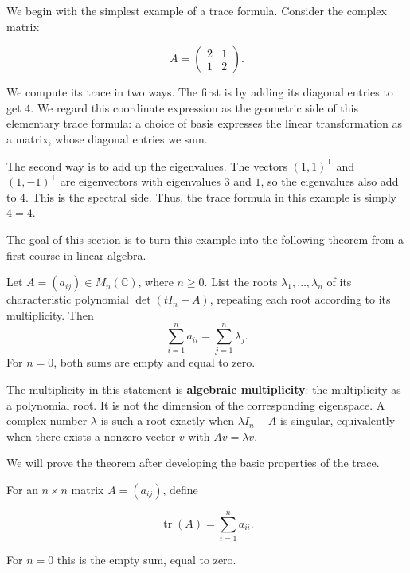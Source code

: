 \label{a-quantity-seen-in-two-ways}

We begin with the simplest example of a trace formula.  Consider the complex matrix

\[
A=\begin{pmatrix}2&1\\1&2\end{pmatrix}.
\]

We compute its trace in two ways. The first is by adding its diagonal entries to get $4$. We regard this coordinate expression as the geometric side of this elementary trace formula: a choice of basis expresses the linear transformation as a matrix, whose diagonal entries we sum.

\label{linear-algebra.transpose}

The second way is to add up the eigenvalues. The vectors $(1,1)^{\mathsf{T}}$ and $(1,-1)^{\mathsf{T}}$ are eigenvectors with eigenvalues $3$ and $1$, so the eigenvalues also add to $4$. This is the spectral side. Thus, the trace formula in this example is simply $4=4$.

The goal of this section is to turn this example into the following theorem from a first course in linear algebra. 

\begin{theorem}\label{linear-algebra.trace-eigenvalue-sum}
Let $A=(a_{ij})\in M_n(\mathbb C)$, where $n\geq0$. List the roots $\lambda_1,\ldots,\lambda_n$ of its characteristic polynomial $\det(tI_n-A)$, repeating each root according to its multiplicity. Then
\[
\sum_{i=1}^{n}a_{ii}=\sum_{j=1}^{n}\lambda_j.
\]
For $n=0$, both sums are empty and equal to zero.
\end{theorem}

The multiplicity in this statement is \textbf{algebraic multiplicity}: the multiplicity as a polynomial root. It is not the dimension of the corresponding eigenspace. A complex number $\lambda$ is such a root exactly when $\lambda I_n-A$ is singular, equivalently when there exists a nonzero vector $v$ with $Av=\lambda v$.

We will prove the theorem after developing the basic properties of the trace.

\begin{definition}[Trace]\label{definition-the-trace}

For an $n\times n$ matrix $A=(a_{ij})$, define

\[
\operatorname{tr}(A)=\sum_{i=1}^{n}a_{ii}.
\]

For $n=0$ this is the empty sum, equal to zero.
\end{definition}


